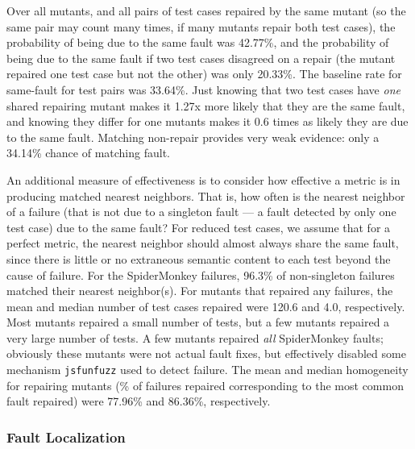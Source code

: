 Over all mutants, and all pairs of test cases repaired by the same mutant (so the same pair may count many times, if many mutants repair both test cases), the probability of being due to the same fault was 42.77\%, and the probability of being due to the same fault if two test cases disagreed on a repair (the mutant repaired one test case but not the other) was only 20.33\%.  The baseline rate for same-fault for test pairs was 33.64\%.  Just knowing that two test cases have \emph{one} shared repairing mutant makes it 1.27x more likely that they are the same fault, and knowing they differ for one mutants makes it 0.6 times as likely they are due to the same fault.  Matching non-repair provides very weak evidence:  only a 34.14\% chance of matching fault.

An additional measure of effectiveness is to consider how effective a metric is in producing matched nearest neighbors.  That is, how often is the nearest neighbor of a failure (that is not due to a singleton fault --- a fault detected by only one test case) due to the same fault?  For reduced \cite{DD,PLDI13,
CReduce} test cases, we assume that for a perfect metric, the nearest neighbor should almost always share the same fault, since there is little or no extraneous semantic content to each test beyond the cause of failure.  For the SpiderMonkey failures, 96.3\% of non-singleton failures matched their nearest neighbor(s).  For mutants that repaired any failures, the mean and median number of test cases repaired were 120.6 and 4.0, respectively.  Most mutants repaired a small number of tests, but a few mutants repaired a very large number of tests.  A few mutants repaired \emph{all} SpiderMonkey faults; obviously these mutants were not actual fault fixes, but effectively disabled some mechanism {\tt jsfunfuzz} used to detect failure. The mean and median homogeneity for repairing mutants (\% of failures repaired corresponding to the most common fault repaired) were 77.96\% and 86.36\%, respectively.  

\subsubsection{Fault Localization}

